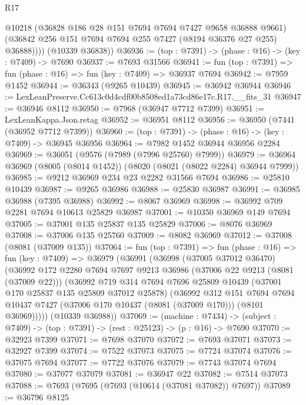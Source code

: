 \begin{lexlean}{R17}
\begin{coremodule}
            @10218
            (@36828 @186 @28 @151 @7694 @7694 @7427 @9658 @36888 @9661)
            (@36842 @256 @151 @7694 @7694 @255 @7427 (@8194 @36376 @27 @255) @36888))))
      (@10339 @36838))
@36936 := (top : @7391) -> (phase : @16) -> (key : @7409) -> @7690
@36937 := @7693 @31566
@36941 := fun (top : @7391) => fun (phase : @16) => fun (key : @7409) => @36937 @7694
@36942 := @7959 @1452
@36944 := @36343 (@9265 @10439)
@36945 := @36942 @36944
@36946 := LexLeanPreserve.Cc613c0d4cdf00b8508ed1a73cd86e17c.R17.__fits_31
@36947 := @36946 @8112
@36950 := @7968 (@36947 @7712 @7399)
@36951 := LexLeanKappa.Json.retag
@36952 := @36951 @8112
@36956 := @36950 (@7441 (@36952 @7712 @7399))
@36960 := (top : @7391) -> (phase : @16) -> (key : @7409) -> @36945 @36956
@36964 := @7982 @1452 @36944 @36956 @2284
@36969 := @36051 (@9576 (@7989 (@7996 @25760) @7999))
@36979 := @36964 @36969 (@8005 (@8014 @1452)) (@8020 (@8021 (@8022 @2284) @36944 @7999))
@36985 := @9212 @36969 @234 @23 @2282 @31566 @7694
@36986 := @25810 @10439
@36987 := @9265 @36986
@36988 := @25830 @36987
@36991 := @36985 @36988 (@7395 @36988)
@36992 := @8067 @36969
@36998 := @36992 @709 @2281 @7694 @10613 @25829 @36987
@37001 := @10350 @36969 @149 @7694
@37005 := @37001 @135 @25837 @135 @25829
@37006 := @8076 @36969
@37008 := @37006 @135 @25760
@37009 := @8082 @36969
@37012 := @37008 (@8081 (@37009 @135))
@37064 := fun (top : @7391) =>
  fun (phase : @16) =>
  fun (key : @7409) =>
  @36979
    (@36991
      (@36998
        (@37005 @37012 @36470)
        (@36992
          @172
          @2280
          @7694
          @7697
          @9213
          @36986
          (@37006 @22 @9213 (@8081 (@37009 @22)))
          (@36992
            @719
            @314
            @7694
            @7696
            @25809
            @10439
            (@37001 @170 @25837 @135 @25809 @37012 @25878)
            (@36992
              @312
              @151
              @7694
              @7694
              @10437
              @7427
              (@37006 @170 @10437 (@8081 (@37009 @170)))
              (@8101 @36969)))))
      (@10339 @36988))
@37069 := (machine : @7434) ->
  (subject : @7409) -> (top : @7391) -> (rest : @25123) -> (p : @16) -> @7690
@37070 := @32923 @7399
@37071 := @7698 @37070
@37072 := @7693 @37071
@37073 := @32927 @7399
@37074 := @7522 @37073
@37075 := @7724 @37074
@37076 := @37075 @7694
@37077 := @7722 @37076
@37079 := @7743 @37074 @7694
@37080 := @37077 @37079
@37081 := @36947 @22
@37082 := @7514 @37073
@37088 := @7693 (@7695 (@7693 (@10614 (@37081 @37082)) @7697))
@37089 := @36796 @8125

\end{coremodule}
\end{lexlean}
